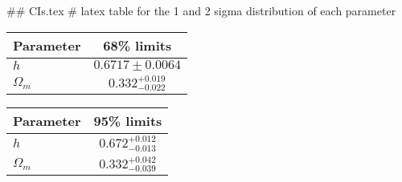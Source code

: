 ## CIs.tex
# latex table for the 1 and 2 sigma distribution of each parameter

\begin{tabular} { l  c}
 Parameter &  68\% limits\\
\hline
{\boldmath$h              $} & $0.6717\pm 0.0064          $\\
{\boldmath$\Omega_m       $} & $0.332^{+0.019}_{-0.022}   $\\
\hline
\end{tabular}

\begin{tabular} { l  c}
 Parameter &  95\% limits\\
\hline
{\boldmath$h              $} & $0.672^{+0.012}_{-0.013}   $\\
{\boldmath$\Omega_m       $} & $0.332^{+0.042}_{-0.039}   $\\
\hline
\end{tabular}
